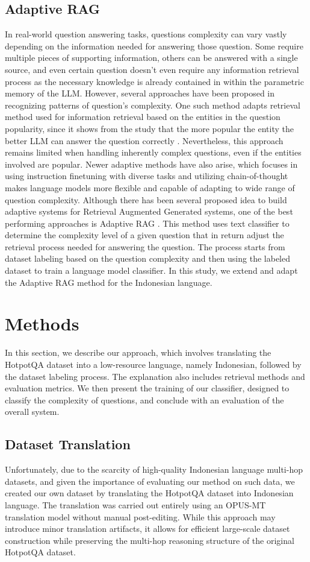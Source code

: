 \documentclass[times]{iapress}
\begin{document}
\subsection{Adaptive RAG}
In real-world question answering tasks, questions complexity can vary vastly depending on the information needed for answering those question. Some require multiple pieces of supporting information, others can be answered with a single source, and even certain question doesn't even require any information retrieval process as the necessary knowledge is already contained in within the parametric memory of the LLM. However, several approaches have been proposed in recognizing patterns of question's complexity. One such method adapts retrieval method used for information retrieval based on the entities in the question popularity, since it shows from the study that the more popular the entity the better LLM can answer the question correctly \cite{trust_llm}. Nevertheless, this approach remains limited when handling inherently complex questions, even if the entities involved are popular. Newer adaptive methods have also arise, which focuses in using instruction finetuning with diverse tasks and utilizing chain-of-thought makes language models more flexible and capable of adapting to wide range of question complexity.
Although there has been several proposed idea to build adaptive systems for Retrieval Augmented Generated systems, one of the best performing approaches is Adaptive RAG \cite{adaptive_rag}. This method uses text classifier to determine the complexity level of a given question that in return adjust the retrieval process needed for answering the question. The process starts from dataset labeling based on the question complexity and then using the labeled dataset to train a language model classifier. In this study, we extend and adapt the Adaptive RAG method for the Indonesian language.


\section{Methods}
\label{sec:methods}
In this section, we describe our approach, which involves translating the HotpotQA dataset into a low-resource language, namely Indonesian, followed by the dataset labeling process. The explanation also includes retrieval methods and evaluation metrics. We then present the training of our classifier, designed to classify the complexity of questions, and conclude with an evaluation of the overall system.

\subsection{Dataset Translation}
Unfortunately, due to the scarcity of high-quality Indonesian language multi-hop datasets, and given the importance of evaluating our method on such data, we created our own dataset by translating the HotpotQA dataset into Indonesian language. The translation was carried out entirely using an OPUS-MT translation model \cite{opus_mt} without manual post-editing. While this approach may introduce minor translation artifacts, it allows for efficient large-scale dataset construction while preserving the multi-hop reasoning structure of the original HotpotQA dataset.
\end{document}
